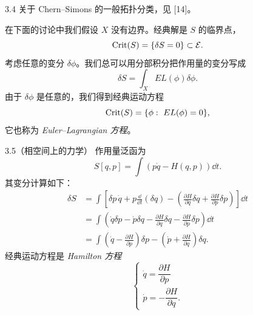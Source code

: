 \begin{wrem}{3.4}
  关于 Chern--Simons 的一般拓扑分类，见 \textup{[14]}。
\end{wrem}

在下面的讨论中我们假设 $X$ 没有边界。经典解是 $S$ 的临界点，
\[
  \operatorname{Crit}(S)=\{\delta S=0\}\subset\mathcal{E}.
\]
考虑任意的变分 $\delta\phi$。我们总可以用分部积分把作用量的变分写成
\[
  \delta S=\int_{X}EL(\phi)\delta\phi.
\]
由于 $\delta\phi$ 是任意的，我们得到经典运动方程
\[
  \operatorname{Crit}(S)=\{\phi:\ EL(\phi)=0\},
\]
它也称为 \emph{Euler--Lagrangian 方程}。


\begin{wexam}{3.5}（相空间上的力学）
  作用量泛函为
  \[
    S[q,p]=\int\left(p\dot q-H(q,p)\right)\dd t.
  \]
  其变分计算如下：
  \[
    \begin{aligned}
      \delta S&=\int\left[\delta p\,\dot q+p\frac{\dd}{\dd t}(\delta q)
      -\left(\frac{\partial H}{\partial q}\delta q
      +\frac{\partial H}{\partial p}\delta p\right)\right]\dd t\\
      &=\int\left(\dot q\delta p-\dot p\delta q
      -\frac{\partial H}{\partial q}\delta q
      -\frac{\partial H}{\partial p}\delta p\right)\dd t\\
      &=\int\left(\dot q-\frac{\partial H}{\partial p}\right)\delta p
      -\left(\dot p+\frac{\partial H}{\partial q}\right)\delta q.
    \end{aligned}
  \]
  经典运动方程是 \emph{Hamilton 方程}
  \[
    \begin{cases}
      \dot q=\dfrac{\partial H}{\partial p}\\[6pt]
      \dot p=-\dfrac{\partial H}{\partial q}.
    \end{cases}
  \]
\end{wexam}


